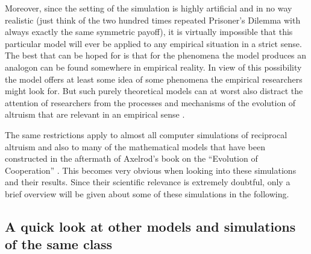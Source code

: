 Moreover, since the setting of the simulation is highly artificial and in no
way realistic (just think of the two hundred times repeated Prisoner's Dilemma
with always exactly the same symmetric payoff), it is virtually impossible
that this particular model will ever be applied to any empirical situation in
a strict sense. The best that can be hoped for is that for the phenomena the
model produces an analogon can be found somewhere in empirical reality. In
view of this possibility the model offers at least some idea of some phenomena
the empirical researchers might look for. But such purely theoretical models
can at worst also distract the attention of researchers from the processes and
mechanisms of the evolution of altruism that are relevant in an empirical
sense \cite[]{hammerstein:2003} \cite[p.\ 167]{dugatkin:1997}.

The same restrictions apply to almost all computer simulations of reciprocal
altruism and also to many of the mathematical models that have been
constructed in the aftermath of Axelrod's book on the ``Evolution of
Cooperation'' \cite[]{axelrod:1984}. This becomes very obvious when looking
into these simulations and their results. Since their scientific relevance is
extremely doubtful, only a brief overview will be given about some of these
simulations in the following.

\subsection{A quick look at other models and simulations of the same
  class}

\label{simulationsOverview}

